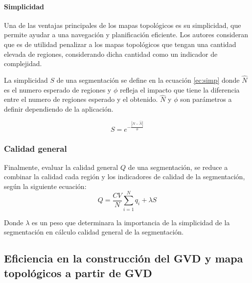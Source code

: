 \paragraph{Simplicidad}
Una de las ventajas principales de los mapas topológicos es su simplicidad, que permite ayudar a una navegación y planificación eficiente. Los autores consideran que es de utilidad penalizar a los mapas topológicos que tengan una cantidad elevada de regiones, considerando dicha cantidad como un indicador de complejidad. 

La simplicidad $S$ de una segmentación se define en la ecuación \ref{ec:simp} donde $\hat{N}$ es el numero esperado de regiones y $\phi$ refleja el impacto que tiene la diferencia entre el numero de regiones esperado y el obtenido. $\hat{N}$ y $\phi$ son parámetros a definir dependiendo de la aplicación.

\begin{equation}
  S=e^{-\frac{|N-\hat{N}|}{\phi}} \label{ec:simp}
\end{equation}


\subsubsection{Calidad general}
Finalmente, evaluar la calidad general $Q$ de una segmentación, se reduce a combinar la calidad cada región y los indicadores de calidad de la segmentación, según la siguiente ecuación:
\begin{equation}
Q=\frac{CV}{N}\sum^N_{i=1}{q_i+\lambda S}
\end{equation}

Donde $\lambda$ es un peso que determinara la importancia de la simplicidad de la segmentación en cálculo calidad general de la segmentación.


\subsection{Eficiencia en la construcción del GVD y mapa topológicos a partir de GVD}

